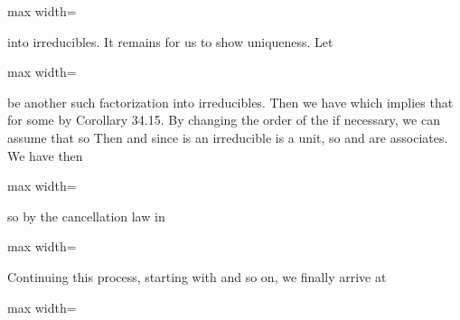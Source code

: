 \documentclass[11pt,oneside]{article}
\begin{document}
\begin{BookBody}
\begin{center}\begin{adjustbox}{max width=\linewidth}\end{adjustbox}\end{center}

\noindent into irreducibles. It remains for us to show uniqueness. Let

\begin{center}\begin{adjustbox}{max width=\linewidth}\end{adjustbox}\end{center}

\noindent be another such factorization into irreducibles. Then we have  which implies that  for some  by Corollary 34.15. By changing the order of the  if necessary, we can assume that  so  Then  and since  is an irreducible is a unit, so  and  are associates. We have then

\begin{center}\begin{adjustbox}{max width=\linewidth}\end{adjustbox}\end{center}

\noindent so by the cancellation law in 

\begin{center}\begin{adjustbox}{max width=\linewidth}\end{adjustbox}\end{center}

\noindent Continuing this process, starting with  and so on, we finally arrive at

\begin{center}\begin{adjustbox}{max width=\linewidth}\end{adjustbox}\end{center}


\end{BookBody}
\end{document}
